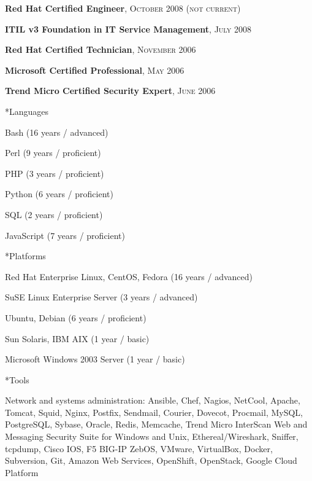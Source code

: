 \documentclass[10pt, a4paper, final]{article}
\begin{document}
\begin{section}
\begin{subsection}
\begin{compactitem}
      \item \textbf{Red Hat Certified Engineer}, \textsc{October 2008 (not current)}
      \item \textbf{ITIL v3 Foundation in IT Service Management}, \textsc{July 2008}
      \item \textbf{Red Hat Certified Technician}, \textsc{November 2006}
      \item \textbf{Microsoft Certified Professional}, \textsc{May 2006}
      \item \textbf{Trend Micro Certified Security Expert}, \textsc{June 2006}
    \end{compactitem}
  \end{subsection}
  \vspace{1em}
  \begin{subsection}*{Languages}
    \begin{compactitem}
      \item Bash (16 years / advanced) 
      \item Perl (9 years / proficient) 
      \item PHP (3 years / proficient) 
      \item Python (6 years / proficient) 
      \item SQL (2 years / proficient) 
      \item JavaScript (7 years / proficient) 
    \end{compactitem}
  \end{subsection}
  \vspace{1em}
  \begin{subsection}*{Platforms}
    \begin{compactitem}
      \item Red Hat Enterprise Linux, CentOS, Fedora (16 years / advanced) 
      \item SuSE Linux Enterprise Server (3 years / advanced) 
      \item Ubuntu, Debian (6 years / proficient) 
      \item Sun Solaris, IBM AIX (1 year / basic) 
      \item Microsoft Windows 2003 Server (1 year / basic) 
    \end{compactitem}
  \end{subsection}
  \vspace{1em}
  \begin{subsection}*{Tools}
    \begin{compactitem}
      \item Network and systems administration: Ansible, Chef, Nagios, NetCool, Apache, Tomcat, Squid, Nginx, Postfix, Sendmail, Courier, Dovecot, Procmail, MySQL, PostgreSQL, Sybase, Oracle, Redis, Memcache, Trend Micro InterScan Web and Messaging Security Suite for Windows and Unix, Ethereal/Wireshark, Sniffer, tcpdump, Cisco IOS, F5 BIG-IP ZebOS, VMware, VirtualBox, Docker, Subversion, Git, Amazon Web Services, OpenShift, OpenStack, Google Cloud Platform

\end{compactitem}
\end{subsection}
\end{section}
\end{document}
